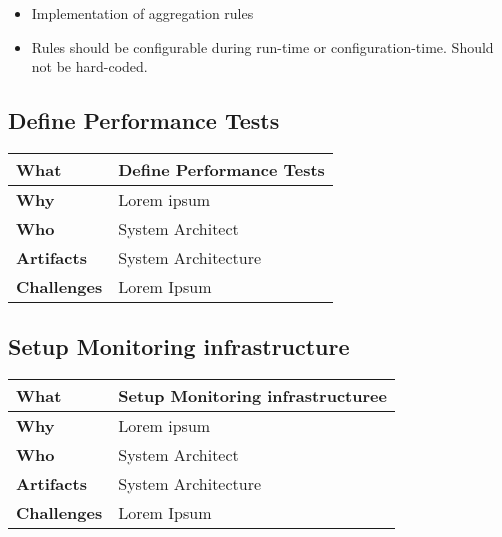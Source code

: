 \begin{itemize}
	\item Implementation of aggregation rules
	\item Rules should be configurable during run-time or configuration-time. Should not be hard-coded.
\end{itemize}

\subsection{Define Performance Tests}
\begin{minipage}{\textwidth}
 \label{table:ch6_Task_Define_Performance_Tests}
\begin{tabular}
	{|m{3cm}|m{10cm}|} \hline \bfseries What & Define Performance Tests\\
	\hline \bfseries Why & Lorem ipsum\\
	\hline \bfseries Who & System Architect\\
	\hline \bfseries Artifacts & System Architecture\\
	\hline \bfseries Challenges & Lorem Ipsum\\
	\hline 
\end{tabular}
\end{minipage}

\subsection{Setup Monitoring infrastructure}
\begin{minipage}{\textwidth}
 \label{table:ch6_Task_Setup_Monitoring_infrastructure}
\begin{tabular}
	{|m{3cm}|m{10cm}|} \hline \bfseries What & Setup Monitoring infrastructuree\\
	\hline \bfseries Why & Lorem ipsum\\
	\hline \bfseries Who & System Architect\\
	\hline \bfseries Artifacts & System Architecture\\
	\hline \bfseries Challenges & Lorem Ipsum\\
	\hline 
\end{tabular}
\end{minipage}

